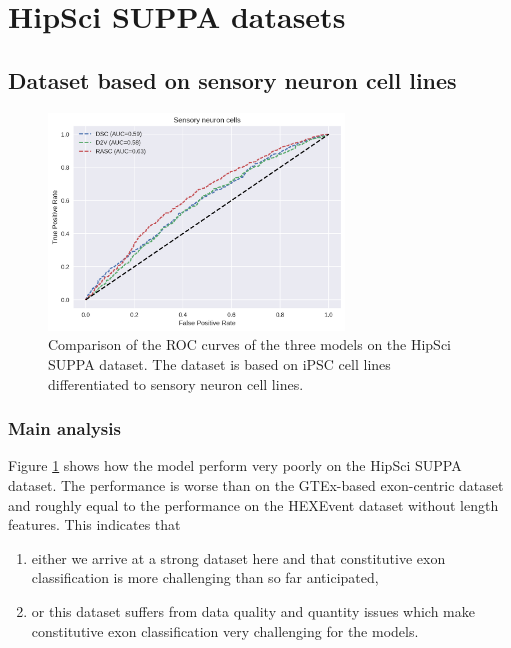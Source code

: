 



\section{HipSci SUPPA datasets} \label{subsec:hipsci_suppa}
\subsection{Dataset based on sensory neuron cell lines}

\begin{figure}
	\centering\includegraphics[width=0.7\textwidth]{../visualizations/ch5-results/suppa_cross_model_roc_auc_comparison.png} 
	\caption{Comparison of the ROC curves of the three models on the HipSci SUPPA dataset. The dataset is based on iPSC cell lines differentiated to sensory neuron cell lines. }
	\label{fig:suppa_auc_roc}
\end{figure}
\subsubsection{Main analysis}
Figure \ref{fig:suppa_auc_roc} shows how the model perform very poorly on the HipSci SUPPA dataset. The performance is worse than on the GTEx-based exon-centric dataset and roughly equal to the performance on the HEXEvent dataset without length features. This indicates that 
\begin{enumerate}
	\item either we arrive at a strong dataset here and that constitutive exon classification is more challenging than so far anticipated,
	\item or this dataset suffers from data quality and quantity issues which make constitutive exon classification very challenging for the models.
\end{enumerate}

